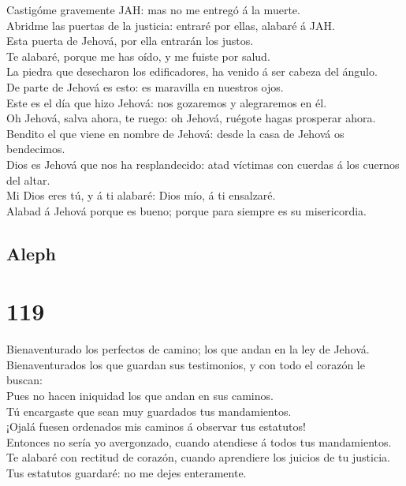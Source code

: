  Castigóme gravemente JAH: mas no me entregó á la muerte.\\
 Abridme las puertas de la justicia: entraré por ellas,
alabaré á JAH.\\
 Esta puerta de Jehová, por ella entrarán los justos.\\
 Te alabaré, porque me has oído, y me fuiste por salud.\\
 La piedra que desecharon los edificadores, ha venido á ser
cabeza del ángulo.\\
 De parte de Jehová es esto: es maravilla en nuestros
ojos.\\
 Este es el día que hizo Jehová: nos gozaremos y
alegraremos en él.\\
 Oh Jehová, salva ahora, te ruego: oh Jehová, ruégote hagas
prosperar ahora.\\
 Bendito el que viene en nombre de Jehová: desde la casa de
Jehová os bendecimos.\\
 Dios es Jehová que nos ha resplandecido: atad víctimas con
cuerdas á los cuernos del altar.\\
 Mi Dios eres tú, y á ti alabaré: Dios mío, á ti
ensalzaré.\\
 Alabad á Jehová porque es bueno; porque para siempre es su
misericordia.

\hypertarget{aleph}{%
\subsection{Aleph}\label{aleph}}

\hypertarget{section-118}{%
\section{119}\label{section-118}}

 Bienaventurado los perfectos de camino; los que andan en la
ley de Jehová.\\
 Bienaventurados los que guardan sus testimonios, y con todo
el corazón le buscan:\\
 Pues no hacen iniquidad los que andan en sus caminos.\\
 Tú encargaste que sean muy guardados tus mandamientos.\\
 ¡Ojalá fuesen ordenados mis caminos á observar tus
estatutos!\\
 Entonces no sería yo avergonzado, cuando atendiese á todos
tus mandamientos.\\
 Te alabaré con rectitud de corazón, cuando aprendiere los
juicios de tu justicia.\\
 Tus estatutos guardaré: no me dejes enteramente.

